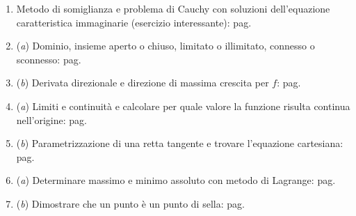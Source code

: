 \documentclass[a4paper]{article}
\begin{document}
\begin{itemize}
\begin{itemize}
\begin{itemize}
\begin{enumerate}[label*=Ex. \arabic*), leftmargin = 4em]
					\item Metodo di somiglianza e problema di Cauchy con soluzioni dell'equazione caratteristica immaginarie (esercizio interessante): pag.~\hyperlink{
						exam: esame 03 marzo 2023 - Gruppo A - 2 esercizio
					}{
					}

					\item (\emph{a}) Dominio, insieme aperto o chiuso, limitato o illimitato, connesso o sconnesso: pag.~\hyperlink{
						exam: esame 03 marzo 2023 - Gruppo A - 3 esercizio (a)
					}{
					}

					\setcounter{enumi}{2}

					\item (\emph{b}) Derivata direzionale e direzione di massima crescita per $f$: pag.~\hyperlink{
						exam: esame 03 marzo 2023 - Gruppo A - 3 esercizio (b)
					}{
					}

					\item (\emph{a}) Limiti e continuità e calcolare per quale valore la funzione risulta continua nell'origine: pag.~\hyperlink{
						exam: esame 03 marzo 2023 - Gruppo A - 4 esercizio (a)
					}{
					}
					
					\setcounter{enumi}{3}
					
					\item (\emph{b}) Parametrizzazione di una retta tangente e trovare l'equazione cartesiana: pag.~\hyperlink{
						exam: esame 03 marzo 2023 - Gruppo A - 4 esercizio (b)
					}{
					}

					\item (\emph{a}) Determinare massimo e minimo assoluto con metodo di Lagrange: pag.~\hyperlink{
						exam: esame 03 marzo 2023 - Gruppo A - 5 esercizio (a)
					}{
					}

					\setcounter{enumi}{4}

					\item (\emph{b}) Dimostrare che un punto è un punto di sella: pag.~\hyperlink{
						exam: esame 03 marzo 2023 - Gruppo A - 5 esercizio (b)
					}{
					}
				\end{enumerate}
			\end{itemize}


\end{itemize}
\end{itemize}
\end{document}
